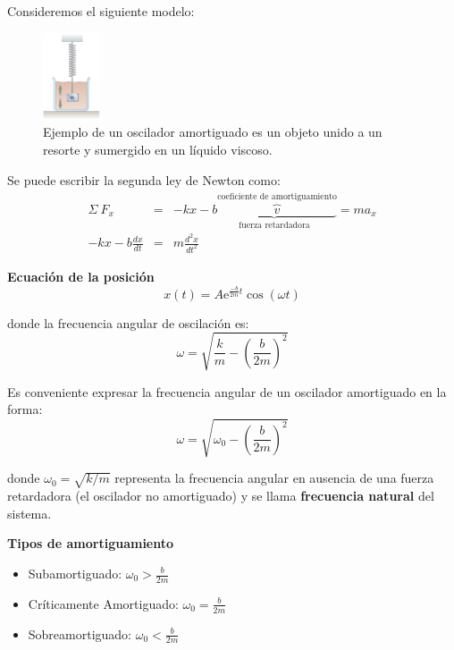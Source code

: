     \vspace{3mm}
    \PN Consideremos el siguiente modelo:

    \begin{figure}[H]
    \centering
      \includegraphics[width=0.15\textwidth]{2/figure_2}
      \caption{Ejemplo de un oscilador amortiguado es un objeto unido a un resorte y sumergido en un líquido viscoso.}
    \end{figure}

    \PN Se puede escribir la segunda ley de Newton como:
    \begin{eqnarray*}
      \Sigma \ F_{x} &=& -kx - \underbrace{b \overbrace{v}^{\text{coeficiente de amortiguamiento}}}_{\text{fuerza retardadora}} = ma_{x} \\
      -kx - b \frac{dx}{dt} &=& m \frac{d^{2}x}{dt^{2}}
    \end{eqnarray*}

    \PN \textbf{Ecuación de la posición}
    \begin{equation}
      x(t) = A \mathrm{e}^{\frac{-b}{2m}t} \cos (\omega t)
    \end{equation}

    \PN donde la frecuencia angular de oscilación es:
    \begin{equation}
      \omega = \sqrt{\frac{k}{m} - \left(\frac{b}{2m}\right)^{2}}
    \end{equation}

    \PN Es conveniente expresar la frecuencia angular de un oscilador amortiguado en la forma:
    \begin{equation}
      \omega = \sqrt{\omega_{0} - \left(\frac{b}{2m}\right)^{2}}
    \end{equation}

    \PN donde $\omega_{0} = \sqrt{k/m}$ representa la frecuencia angular en ausencia de una fuerza retardadora (el
    oscilador no amortiguado) y se llama \textbf{frecuencia natural} del sistema.

    \pagebreak
    \PN \textbf{Tipos de amortiguamiento}
    \begin{itemize}
      \item Subamortiguado: $\omega_{0} > \frac{b}{2m}$
      \item Críticamente Amortiguado: $\omega_{0} = \frac{b}{2m}$
      \item Sobreamortiguado: $\omega_{0} < \frac{b}{2m}$
    \end{itemize}

